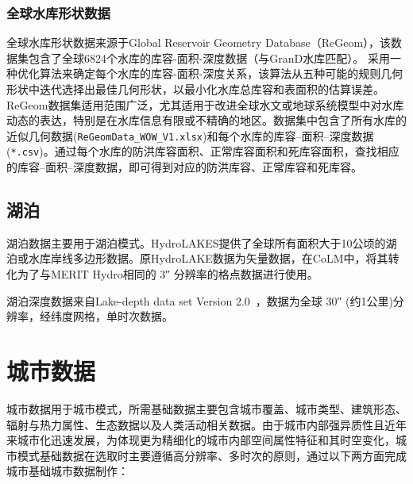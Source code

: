 \subsubsection{全球水库形状数据}

全球水库形状数据来源于Global Reservoir Geometry Database（ReGeom），该数据集包含了全球6824个水库的库容-面积-深度数据（与GranD水库匹配）。\citet{yigzaw2018new} 采用一种优化算法来确定每个水库的库容-面积-深度关系，该算法从五种可能的规则几何形状中迭代选择出最佳几何形状，以最小化水库总库容和表面积的估算误差。ReGeom数据集适用范围广泛，尤其适用于改进全球水文或地球系统模型中对水库动态的表达，特别是在水库信息有限或不精确的地区。数据集中包含了所有水库的近似几何数据(\texttt{ReGeomData\_WOW\_V1.xlsx})和每个水库的库容--面积--深度数据(\texttt{*.csv})。通过每个水库的防洪库容面积、正常库容面积和死库容面积，查找相应的库容--面积--深度数据，即可得到对应的防洪库容、正常库容和死库容。


\subsection{湖泊}
湖泊数据主要用于湖泊模式。HydroLAKES提供了全球所有面积大于10公顷的湖泊或水库岸线多边形数据\citep{messager2016nc}。原HydroLAKE数据为矢量数据，在CoLM中，将其转化为了与MERIT Hydro相同的 \ang{;;3} 分辨率的格点数据进行使用。

湖泊深度数据来自Lake-depth data set Version 2.0~\citep{kourzeneva2012global}，数据为全球 \ang{;;30} (约1公里)分辨率，经纬度网格，单时次数据。


\section{城市数据}\label{城市数据}
城市数据用于城市模式，所需基础数据主要包含城市覆盖、城市类型、建筑形态、辐射与热力属性、生态数据以及人类活动相关数据。由于城市内部强异质性且近年来城市化迅速发展，为体现更为精细化的城市内部空间属性特征和其时空变化，城市模式基础数据在选取时主要遵循高分辨率、多时次的原则，通过以下两方面完成城市基础城市数据制作：

